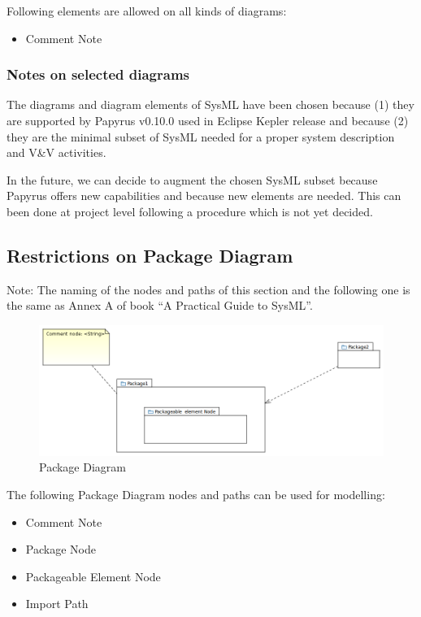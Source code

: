Following elements are allowed on all kinds of diagrams:
\begin{itemize}
\item Comment Note
\end{itemize}

\subsubsection{Notes on selected diagrams}

The diagrams and diagram elements of SysML have been chosen because
(1) they are supported by Papyrus v0.10.0 used in Eclipse Kepler
release and because (2) they are the minimal subset of SysML needed
for a proper system description and V\&V activities.

In the future, we can decide to augment the chosen SysML subset
because Papyrus offers new capabilities and because new elements are
needed. This can been done at project level following a procedure
which is not yet decided.

\subsection{Restrictions on Package Diagram}

Note: The naming of the nodes and paths of this section and the
following one is the same as Annex A of book ``A Practical Guide to
SysML''.


\begin{figure}[ht]
  \centering
  \includegraphics[width=\textwidth]{images/PackageDiagram.PNG}
  \caption{Package Diagram}
  \label{fig:package diagram}
\end{figure}


The following Package Diagram nodes and paths can be used for
modelling:
\begin{itemize}
\item Comment Note 
\item Package Node 
\item Packageable Element Node
\item Import Path 
\end{itemize}

